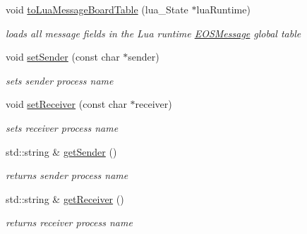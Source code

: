 \begin{CompactItemize}
void \hyperlink{classEOSMessage_2acc24a0b1bd887a34357057a0678537}{toLuaMessageBoardTable} (lua\_\-State $\ast$luaRuntime)
\begin{CompactList}\small\item\em loads all message fields in the Lua runtime \hyperlink{classEOSMessage}{EOSMessage} global table \item\end{CompactList}\item 
void \hyperlink{classEOSMessage_fee56421daea7a52d9c9bfccb95e92ee}{setSender} (const char $\ast$sender)
\begin{CompactList}\small\item\em sets sender process name \item\end{CompactList}\item 
void \hyperlink{classEOSMessage_cd7733e73deb926208b222b7f7c50d4d}{setReceiver} (const char $\ast$receiver)
\begin{CompactList}\small\item\em sets receiver process name \item\end{CompactList}\item 
std::string \& \hyperlink{classEOSMessage_1d5409e96cc5af7426f36b4e7e90e745}{getSender} ()
\begin{CompactList}\small\item\em returns sender process name \item\end{CompactList}\item 
std::string \& \hyperlink{classEOSMessage_190437e488f9966c3a66efc6343dd2ff}{getReceiver} ()
\begin{CompactList}\small\item\em returns receiver process name \item\end{CompactList}\end{CompactItemize}
